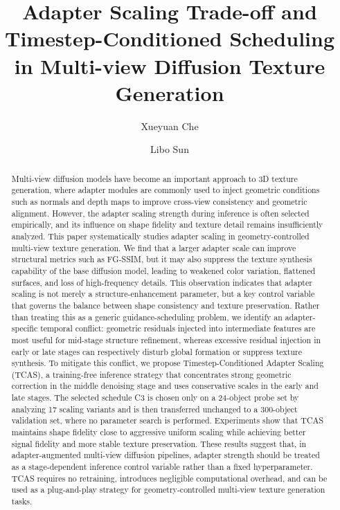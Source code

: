 \documentclass[times,twocolumn,final]{elsarticle}
\providecommand{\DIFadd}[1]{{\protect\color{red} \sf #1}} %
\providecommand{\DIFaddbegin}{} %
\providecommand{\DIFaddend}{} %
\providecommand{\DIFdelbegin}{} %
\providecommand{\DIFdelend}{} %
\newcommand{\DIFscaledelfig}{0.5}
\newlength{\DIFdelgraphicswidth} %
\newlength{\DIFdelgraphicsheight} %
\newcommand{\DIFaddincludegraphics}[2][]{{\color{red}\fbox{\DIFOincludegraphics[#1]{#2}}}} %
\newcommand{\DIFdelincludegraphics}[2][]{%
\sbox{\DIFdelgraphicsbox}{\DIFOincludegraphics[#1]{#2}}%
\settoboxwidth{\DIFdelgraphicswidth}{\DIFdelgraphicsbox} %
\settoboxtotalheight{\DIFdelgraphicsheight}{\DIFdelgraphicsbox} %
\scalebox{\DIFscaledelfig}{%
\parbox[b]{\DIFdelgraphicswidth}{\usebox{\DIFdelgraphicsbox}\\[-\baselineskip] \rule{\DIFdelgraphicswidth}{0em}}\llap{\resizebox{\DIFdelgraphicswidth}{\DIFdelgraphicsheight}{%
\setlength{\unitlength}{\DIFdelgraphicswidth}%
\begin{picture}(1,1)%
\thicklines\linethickness{2pt} %
{\color[rgb]{1,0,0}\put(0,0){\framebox(1,1){}}}%
{\color[rgb]{1,0,0}\put(0,0){\line( 1,1){1}}}%
{\color[rgb]{1,0,0}\put(0,1){\line(1,-1){1}}}%
\end{picture}%
}\hspace*{3pt}}} %
} %
\DeclareRobustCommand{\DIFaddbegin}{\DIFOaddbegin \let\includegraphics\DIFaddincludegraphics} %
\DeclareRobustCommand{\DIFaddend}{\DIFOaddend \let\includegraphics\DIFOincludegraphics} %
\DeclareRobustCommand{\DIFdelbegin}{\DIFOdelbegin \let\includegraphics\DIFdelincludegraphics} %
\DeclareRobustCommand{\DIFdelend}{\DIFOaddend \let\includegraphics\DIFOincludegraphics} %
\begin{document}
\begin{frontmatter}

\title{Adapter Scaling Trade-off and Timestep-Conditioned Scheduling in Multi-view Diffusion Texture Generation}

\DIFdelbegin %
\DIFdelend \DIFaddbegin \author[a]{\DIFadd{Xueyuan Che}\DIFaddend }
\DIFaddbegin {}
\author[a]{\DIFadd{Libo Sun}}
\address[a]{School of Instrument Science and Engineering, Southeast University, Nanjing 210096, China}
\DIFaddend 

\begin{abstract}
Multi-view diffusion models have become an important approach to 3D texture generation, where adapter modules are commonly used to inject geometric conditions such as normals and depth maps to improve cross-view consistency and geometric alignment. However, the adapter scaling strength during inference is often selected empirically, and its influence on shape fidelity and texture detail remains insufficiently analyzed. This paper systematically studies adapter scaling in geometry-controlled multi-view texture generation. We find that a larger adapter scale can improve structural metrics such as FG-SSIM, but it may also suppress the texture synthesis capability of the base diffusion model, leading to weakened color variation, flattened surfaces, and loss of high-frequency details. This observation indicates that adapter scaling is not merely a structure-enhancement parameter, but a key control variable that governs the balance between shape consistency and texture preservation. Rather than treating this as a generic guidance-scheduling problem, we identify an adapter-specific temporal conflict: geometric residuals injected into intermediate features are most useful for mid-stage structure refinement, whereas excessive residual injection in early or late stages can respectively disturb global formation or suppress texture synthesis. To mitigate this conflict, we propose Timestep-Conditioned Adapter Scaling (TCAS), a training-free inference strategy that concentrates strong geometric correction in the middle denoising stage and uses conservative scales in the early and late stages. The selected schedule C3 is chosen only on a 24-object probe set by analyzing 17 scaling variants and is then transferred unchanged to a 300-object validation set, where no parameter search is performed. Experiments show that TCAS maintains shape fidelity close to aggressive uniform scaling while achieving better signal fidelity and more stable texture preservation. These results suggest that, in adapter-augmented multi-view diffusion pipelines, adapter strength should be treated as a stage-dependent inference control variable rather than a fixed hyperparameter. TCAS requires no retraining, introduces negligible computational overhead, and can be used as a plug-and-play strategy for geometry-controlled multi-view texture generation tasks.
\end{abstract}


\end{frontmatter}
\end{document}
